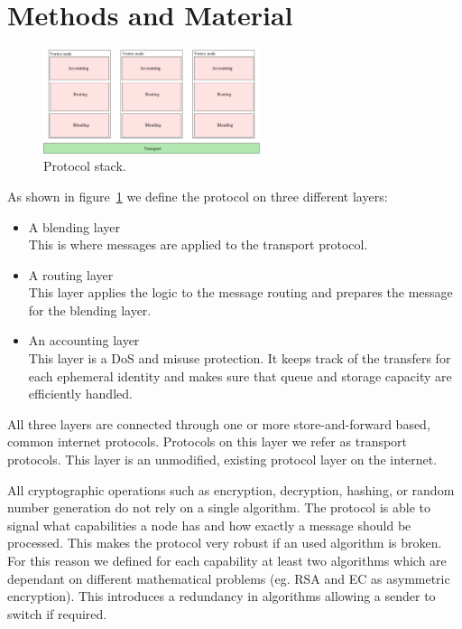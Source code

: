 \documentclass[9pt,journal,compsoc]{IEEEtran}
\begin{document}
\section{Methods and Material}

\begin{figure}[!t]
\centering
\includegraphics[width=2.5in]{../inc/roughProtocolDesign}
\caption{Protocol stack.}
\label{fig:layers}
\end{figure}
As shown in figure~\ref{fig:layers} we define the protocol on three different layers:
\begin{itemize}
	\item A blending layer\\
	      This is where messages are applied to the transport protocol. 
	\item A routing layer\\
	      This layer applies the logic to the message routing and prepares the message for the blending layer.
	\item An accounting layer\\
	      This layer is a DoS and misuse protection. It keeps track of the transfers for each ephemeral identity and makes sure that queue and storage capacity are efficiently handled.     
\end{itemize}
All three layers are connected through one or more store-and-forward based, common internet protocols. Protocols on this layer we refer as transport protocols. This layer is an unmodified, existing protocol layer on the internet.

All cryptographic operations such as encryption, decryption, hashing, or random number generation do not rely on a single algorithm. The protocol is able to signal what capabilities a node has and how exactly a message should be processed. This makes the protocol very robust if an used algorithm is broken. For this reason we defined for each capability at least two algorithms which are dependant on different mathematical problems (eg. RSA and EC as asymmetric encryption). This introduces a redundancy in algorithms allowing a sender to switch if required.
\end{document}
